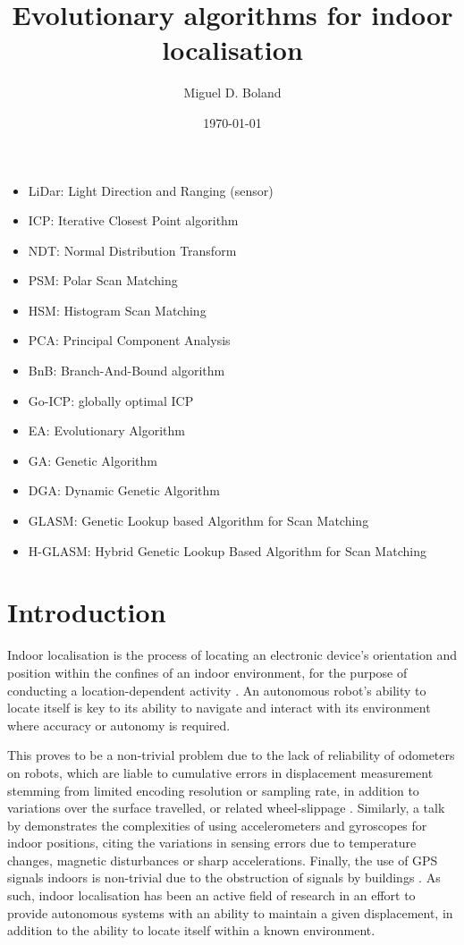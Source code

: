 \documentclass[authoryearcitations]{UoYCSproject}
\author{Miguel D. Boland}
\title{Evolutionary algorithms for indoor localisation}
\date{\today}
\begin{document}
\maketitle
\listoffigures
\listoftables
\clearpage
\lstlistoflistings
\begin{itemize}
	\item LiDar: Light Direction and Ranging (sensor)
	\item ICP: Iterative Closest Point algorithm \cite{Besl1992-pd}
	\item NDT: Normal Distribution Transform
	\item PSM: Polar Scan Matching
	\item HSM: Histogram Scan Matching
	\item PCA: Principal Component Analysis
	\item BnB: Branch-And-Bound algorithm \cite{Land1960-yw}
	\item Go-ICP: globally optimal ICP \cite{Yang2013-gx}
	\item EA: Evolutionary Algorithm
	\item GA: Genetic Algorithm
	\item DGA: Dynamic Genetic Algorithm \cite{Chow2004-xc}
	\item GLASM: Genetic Lookup based Algorithm for Scan Matching \cite{Lenac2007-xm}
	\item H-GLASM: Hybrid Genetic Lookup Based Algorithm for Scan Matching \cite{Lenac2011-co}

\end{itemize}


\chapter{Introduction}
\label{cha:Introduction}
Indoor localisation is the process of locating an electronic device's orientation and position within the confines of an indoor environment, for the purpose of conducting a location-dependent activity \cite{Curran2011-zs}. An autonomous robot's ability to locate itself is key to its ability to navigate and interact with its environment where accuracy or autonomy is required.
\newline

This proves to be a non-trivial problem due to the lack of reliability of odometers on robots, which are liable to cumulative errors in displacement measurement stemming from limited encoding resolution or sampling rate, in addition to variations over the surface travelled, or related wheel-slippage \cite{Borenstein1996-al}. Similarly, a talk by \citet{Sachs2010-pw} demonstrates the complexities of using accelerometers and gyroscopes for indoor positions, citing the variations in sensing errors due to temperature changes, magnetic disturbances or sharp accelerations. Finally, the use of GPS signals indoors is non-trivial due to the obstruction of signals by buildings \cite{Gowdayyanadoddi2015-hg}. As such, indoor localisation has been an active field of research in an effort to provide autonomous systems with an ability to maintain a given displacement, in addition to the ability to locate itself within a known environment. 
\newline
\end{document}
